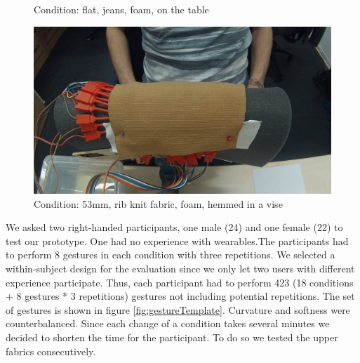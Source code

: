 \begin{figure}
\caption{Condition: flat, jeans, foam, on the table}
\label{fig:topview}
\end{figure}\begin{figure}
\includegraphics[scale=0.15]{images/53mmtopview.jpg}
\caption{Condition: 53mm, rib knit fabric, foam, hemmed in  a vise}
\label{fig:53mmtopview}
\end{figure}We asked two right-handed participants, one male (24) and one female (22) to test our prototype. One had no experience with wearables.The participants had to perform 8 gestures in each condition with three repetitions. We selected a within-subject design for the evaluation since we only let two users with different experience participate. Thus, each participant had to perform 423 (18 conditions + 8  gestures * 3 repetitions) gestures not including potential repetitions. The set of gestures is shown in figure \ref{fig:gestureTemplate}. Curvature and softness were counterbalanced. Since each change of a condition takes several minutes we decided to shorten the time for the participant. To do so we tested the upper fabrics consecutively. \\
